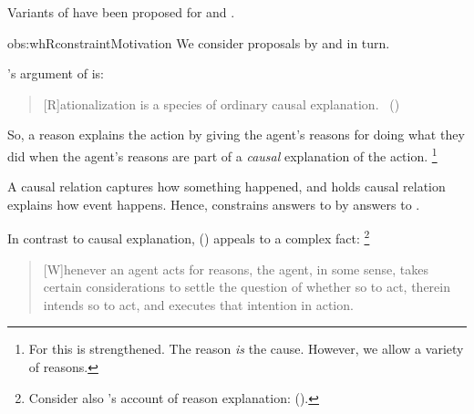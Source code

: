 \begin{note}
  \begin{observation}%
    \label{obs:whRconstraintMotivation}%
    Variants of \issueInclusion{} have been proposed for \qWhyR{} and \qHow{}.
  \end{observation}
  \begin{motivation}{obs:whRconstraintMotivation}
    We consider proposals by \citeauthor{Davidson:1963aa} and \citeauthor{Hieronymi:2011aa} in turn.
    \medskip

    \noindent%
    \citeauthor{Davidson:1963aa}'s argument of  is:
    \begin{quote}
      [R]ationalization is a species of ordinary causal explanation.%
      \mbox{ }\hfill\mbox{(\citeyear[685]{Davidson:1963aa})}
    \end{quote}
    So, a reason explains the action by giving the agent's reasons for doing what they did when the agent's reasons are part of a \emph{causal} explanation of the action.%
    \footnote{
      For \citeauthor{Davidson:1963aa} this is strengthened.
      The \agents{} reason \emph{is} the cause.
      However, we allow a variety of reasons.
    }

    A causal relation captures how something happened, and \citeauthor{Davidson:1963aa} holds causal relation explains how event happens.
    Hence, \citeauthor{Davidson:1963aa} constrains answers to \qWhyR{} by answers to \qHowR{}.
    \medskip

    \noindent%
    In contrast to causal explanation, \citeauthor{Hieronymi:2011aa} (\citeyear{Hieronymi:2011aa}) appeals to a complex fact:%
    \footnote{
      Consider also \citeauthor{Harman:1973ww}'s account of reason explanation:
       (\citeyear[52]{Harman:1973ww}).
    }
    \begin{quote}
      [W]henever an agent acts for reasons, the agent, in some sense, takes certain considerations to settle the question of whether so to act, therein intends so to act, and executes that intention in action.


\end{quote}
\end{motivation}
\end{note}
